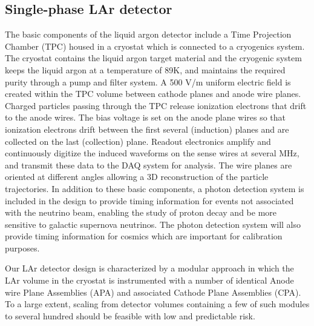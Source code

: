 \subsection{Single-phase LAr detector}


The basic components of the liquid argon detector include a Time Projection Chamber (TPC) housed in a cryostat which is connected to  
a cryogenics system. 
%
The cryostat contains the liquid argon target material and the cryogenic system keeps the liquid argon at a temperature of 89K, and maintains the required purity through a pump and filter system. A 500 V/m uniform electric field is created within the TPC volume between cathode planes and anode wire planes. Charged particles passing through the TPC release ionization electrons that drift to the anode wires. The bias voltage is set on the anode plane wires so that ionization electrons drift between the first several (induction) planes and are collected on the last (collection) plane. Readout electronics amplify and continuously digitize the induced waveforms on the sense wires at several MHz, and transmit these data to the DAQ system for analysis. The wire planes are oriented at different angles allowing a 3D reconstruction of the particle trajectories. In addition to these basic components, a photon detection system
is included in the design to provide timing information for events not associated with the neutrino beam, enabling the study of proton decay and be more sensitive to galactic supernova neutrinos.  The photon detection system will also provide timing information for cosmics which are important for calibration purposes.

Our LAr detector design is characterized by a modular approach in which the LAr volume in the cryostat is instrumented with a number of identical Anode wire Plane Assemblies (APA) and associated Cathode Plane Assemblies (CPA). To a large extent, scaling from detector volumes containing a few of such modules  to several hundred should be feasible with low and predictable risk.\\









%






